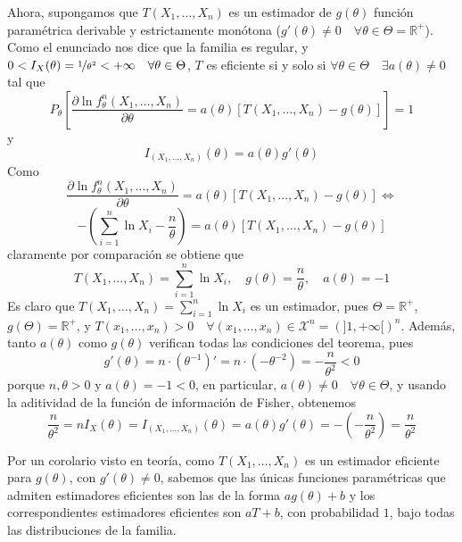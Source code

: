 \documentclass[12pt]{article}
\newcommand{\R}{\mathbb{R}}
\newcommand{\Rmas}{\R^{+}}
\newcommand{\X}{\mathcal{X}}
\begin{document}
\begin{ejercicio}
\begin{enumerate}[label=\alph*)]
\begin{enumerate}[label=\alph*)]
                    Ahora, supongamos que $T(X_1, \ldots, X_n)$ es un estimador de $g(\theta)$ función paramétrica derivable y estrictamente monótona
                    ($g'(\theta) \neq 0 \quad \forall \theta \in \Theta = \Rmas$). Como el enunciado nos dice que la familia es regular, y 
                    $0 < I_X(\theta) = \nicefrac{1}{\theta^2} < +\infty \quad \forall \theta \in \Theta$, $T$ es eficiente si y solo si $\forall \theta \in \Theta
                    \quad \exists a(\theta) \neq 0$ tal que 
                    $$P_\theta \left[ \dfrac{\partial \ln f_\theta^n(X_1, \ldots, X_n)}{\partial \theta} = a(\theta)[T(X_1, \ldots, X_n) - g(\theta)]\right] = 1$$
                    y
                    $$I_{(X_1, \ldots, X_n)}(\theta) = a(\theta) g'(\theta)$$
                    Como 
                    $$\dfrac{\partial \ln f_\theta^n(X_1, \ldots, X_n)}{\partial \theta} = a(\theta)[T(X_1, \ldots, X_n) - g(\theta)] \iff$$
                    $$- \left(\sum_{i=1}^{n} \ln X_i - \dfrac{n}{\theta} \right) = a(\theta) [T(X_1, \ldots, X_n) - g(\theta)]$$
                    claramente por comparación se obtiene que 
                    $$T(X_1, \ldots, X_n) = \sum_{i=1}^{n} \ln X_i, \quad g(\theta) = \dfrac{n}{\theta}, \quad a(\theta) = -1$$
                    Es claro que $T(X_1, \ldots, X_n) = \sum_{i=1}^n \ln X_i$ es un estimador, pues $\Theta = \Rmas$, $g(\Theta) = \Rmas$, y 
                    $T(x_1, \ldots, x_n) > 0 \quad \forall (x_1, \ldots, x_n) \in \X^n = (]1, +\infty[)^n$. Además, tanto 
                    $a(\theta)$ como $g(\theta)$ verifican todas las condiciones del teorema, pues 
                    $$g'(\theta) = n \cdot (\theta^{-1})' = n \cdot (- \theta^{-2}) = -\dfrac{n}{\theta^2} < 0$$ porque $n, \theta > 0$
                    y $a(\theta) = -1 < 0$, en particular, $a(\theta) \neq 0 \quad \forall \theta \in \Theta$, y usando la aditividad de la función de información de Fisher, obtenemos
                    $$\dfrac{n}{\theta^2} = n I_X(\theta) = I_{(X_1, \ldots, X_n)}(\theta) = a(\theta) g'(\theta) = - \left( - \dfrac{n}{\theta^2} \right) = \dfrac{n}{\theta^2}$$
        
                    Por un corolario visto en teoría, como $T(X_1, \ldots, X_n)$ es un estimador eficiente para $g(\theta)$, con $g'(\theta) \neq 0$,
                    sabemos que las únicas funciones paramétricas que admiten estimadores eficientes son las de la forma $a g(\theta) + b$ y los correspondientes
                    estimadores eficientes son $aT + b$, con probabilidad $1$, bajo todas las distribuciones de la familia.


\end{enumerate}
\end{enumerate}
\end{ejercicio}
\end{document}

